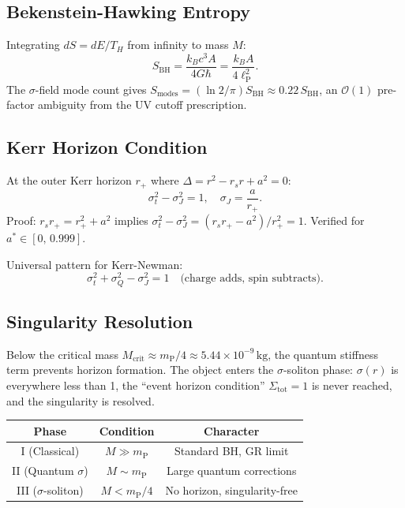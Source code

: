 \documentclass[12pt,a4paper]{article}
\newcommand{\lP}{\ell_{\mathrm{P}}}
\begin{document}
\subsection{Bekenstein-Hawking Entropy}

Integrating $dS = dE/T_H$ from infinity to mass $M$:
\begin{equation}
  \boxed{S_\mathrm{BH} = \frac{k_B c^3 A}{4G\hbar} = \frac{k_B A}{4\lP^2}.}
\end{equation}
The $\sigma$-field mode count gives $S_\mathrm{modes} = (\ln 2/\pi)S_\mathrm{BH}
\approx 0.22\,S_\mathrm{BH}$, an $\mathcal{O}(1)$ pre-factor ambiguity from the
UV cutoff prescription.

\subsection{Kerr Horizon Condition}

At the outer Kerr horizon $r_+$ where $\Delta = r^2 - r_s r + a^2 = 0$:
\begin{equation}
  \sigma_t^2 - \sigma_J^2 = 1, \quad
  \sigma_J = \frac{a}{r_+}.
\end{equation}
Proof: $r_s r_+ = r_+^2 + a^2$ implies $\sigma_t^2 - \sigma_J^2 = (r_s r_+ - a^2)/r_+^2 = 1$.
Verified for $a^* \in [0,\,0.999]$.

Universal pattern for Kerr-Newman:
\begin{equation}
  \sigma_t^2 + \sigma_Q^2 - \sigma_J^2 = 1
  \quad \text{(charge adds, spin subtracts).}
\end{equation}

\subsection{Singularity Resolution}

Below the critical mass $M_\mathrm{crit} \approx m_\mathrm{P}/4 \approx 5.44\times10^{-9}\,\mathrm{kg}$,
the quantum stiffness term prevents horizon formation. The object enters the
$\sigma$-soliton phase: $\sigma(r)$ is everywhere less than 1, the
``event horizon condition'' $\Sigma_\mathrm{tot} = 1$ is never reached, and the
singularity is resolved.

\medskip
\begin{center}
\renewcommand{\arraystretch}{1.2}
\begin{tabular}{ccc}
\toprule
Phase & Condition & Character\\
\midrule
I (Classical) & $M\gg m_\mathrm{P}$ & Standard BH, GR limit\\
II (Quantum $\sigma$) & $M\sim m_\mathrm{P}$ & Large quantum corrections\\
III ($\sigma$-soliton) & $M < m_\mathrm{P}/4$ & No horizon, singularity-free\\
\bottomrule
\end{tabular}
\end{center}
\end{document}
